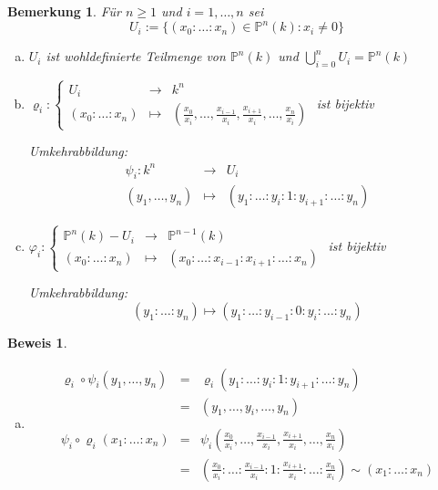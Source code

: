 \documentclass[a4paper, 12pt, numbers=noendperiod, chapterprefix=true, headsepline]{scrbook}
\theoremstyle{break}
\newtheorem{Bem}[Def]{Bemerkung}
\theoremstyle{nonumberbreak}
\newtheorem{Bew}{Beweis}
\theoremstyle{nonumberplain}
\newcommand{\IP}{\mathbb{P}}%
\begin{document}
\begin{Bem}
F\"ur $n\ge1$ und $i=1,\dots ,n$ sei
	\[U_i:=\{ (x_0:\ldots :x_n)\in \IP^n(k):x_i\not=0\}\]
\begin{enumerate}[a)]
\item
	$U_i$ ist wohldefinierte Teilmenge von $\IP^n(k)$ und $\bigcup\limits_{i=0}^n U_i=\IP^n(k)$

\item
	$\varrho_i: \left\{ \begin{array}{rcl}
		U_i &\to& k^n\\
		(x_0:\ldots :x_n) &\mapsto& (\frac{x_0}{x_i}, \dots ,\frac{x_{i-1}}{x_i}, \frac{x_{i+1}}{x_i}, \dots , \frac{x_n}{x_i})
	\end{array} \right.$ ist bijektiv
	
	Umkehrabbildung:
		\[\begin{array}{rcl} 
			\psi_i:k^n &\to& U_i\\
			(y_1,\dots , y_n) &\mapsto& (y_1:\ldots: y_i :1:y_{i+1}:\ldots:y_n)
		\end{array}\]
		
\item
	$\varphi_i: \left\{ \begin{array}{rcl}
		\IP^n(k)-U_i &\to& \IP^{n-1}(k)\\
		(x_0:\ldots :x_n) &\mapsto& (x_0: \ldots: x_{i-1}: x_{i+1}: \ldots: x_n)
	\end{array} \right.$ ist bijektiv
	
	Umkehrabbildung:
		\[ (y_1: \ldots: y_n) \mapsto (y_1:\ldots:y_{i-1}:0:y_i:\ldots:y_n)\]
\end{enumerate}\end{Bem}

\begin{Bew}\begin{enumerate}[a)]\item[b)]
\[\begin{array}{rcl}
	\varrho_i\circ\psi_i(y_1,\dots ,y_n) &=&\varrho_i(y_1:\ldots:y_i:1:y_{i+1}:\ldots:y_n )\\
	&=& (y_1,\dots ,y_i,\dots ,y_n)\\ &&\\
	\psi_i\circ\varrho_i(x_1:\ldots:x_n)  &=& \psi_i(\frac{x_0}{x_i},\dots ,\frac{x_{i-1}}{x_i},\frac{x_{i+1}}{x_i},\dots ,\frac{x_n}{x_i})\\
	&=& (\frac{x_0}{x_i}:\ldots :\frac{x_{i-1}}{x_i}:1:\frac{x_{i+1}}{x_i}:\ldots :\frac{x_n}{x_i})\sim(x_1:\ldots:x_n )
\end{array}\]
\end{enumerate}\end{Bew}
\end{document}
